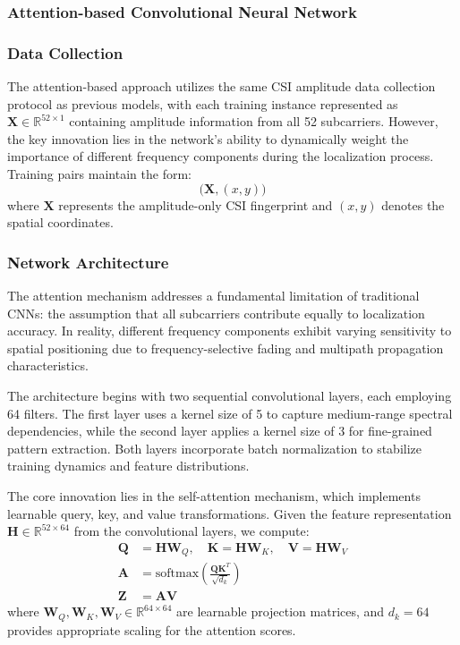 \subsubsection{Attention-based Convolutional Neural Network}

\subsubsection{Data Collection}
The attention-based approach utilizes the same CSI amplitude data collection protocol as previous models, with each training instance represented as $\mathbf{X} \in \mathbb{R}^{52 \times 1}$ containing amplitude information from all 52 subcarriers. However, the key innovation lies in the network's ability to dynamically weight the importance of different frequency components during the localization process. Training pairs maintain the form:
\begin{equation}\label{eq:attention_training}
\big(\mathbf{X}, (x,y)\big)
\end{equation}
where $\mathbf{X}$ represents the amplitude-only CSI fingerprint and $(x,y)$ denotes the spatial coordinates.

\subsubsection{Network Architecture}
The attention mechanism addresses a fundamental limitation of traditional CNNs: the assumption that all subcarriers contribute equally to localization accuracy. In reality, different frequency components exhibit varying sensitivity to spatial positioning due to frequency-selective fading and multipath propagation characteristics.

The architecture begins with two sequential convolutional layers, each employing 64 filters. The first layer uses a kernel size of 5 to capture medium-range spectral dependencies, while the second layer applies a kernel size of 3 for fine-grained pattern extraction. Both layers incorporate batch normalization to stabilize training dynamics and feature distributions.

The core innovation lies in the self-attention mechanism, which implements learnable query, key, and value transformations. Given the feature representation $\mathbf{H} \in \mathbb{R}^{52 \times 64}$ from the convolutional layers, we compute:
\begin{align}
\mathbf{Q} &= \mathbf{H}\mathbf{W}_Q, \quad \mathbf{K} = \mathbf{H}\mathbf{W}_K, \quad \mathbf{V} = \mathbf{H}\mathbf{W}_V \\
\mathbf{A} &= \text{softmax}\left(\frac{\mathbf{Q}\mathbf{K}^T}{\sqrt{d_k}}\right) \\
\mathbf{Z} &= \mathbf{A}\mathbf{V}
\end{align}
where $\mathbf{W}_Q, \mathbf{W}_K, \mathbf{W}_V \in \mathbb{R}^{64 \times 64}$ are learnable projection matrices, and $d_k = 64$ provides appropriate scaling for the attention scores.

